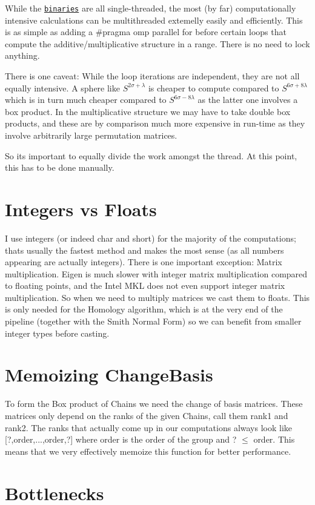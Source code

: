 \begin{DoxyItemize}
\item While the \href{https://github.com/NickG-Math/Mackey/tree/master/bin}{\tt binaries} are all single-\/threaded, the most (by far) computationally intensive calculations can be multithreaded extemelly easily and efficiently. This is as simple as adding a {\ttfamily \#pragma omp parallel for} before certain loops that compute the additive/multiplicative structure in a range. There is no need to lock anything.
\item There is one caveat\+: While the loop iterations are independent, they are not all equally intensive. A sphere like $S^{2\sigma+\lambda}$ is cheaper to compute compared to $S^{6\sigma+8\lambda}$ which is in turn much cheaper compared to $S^{6\sigma-8\lambda}$ as the latter one involves a box product. In the multiplicative structure we may have to take double box products, and these are by comparison much more expensive in run-\/time as they involve arbitrarily large permutation matrices.
\item So it\textquotesingle{}s important to equally divide the work amongst the thread. At this point, this has to be done manually.
\end{DoxyItemize}\hypertarget{perf_intvsfloat}{}\section{Integers vs Floats}\label{perf_intvsfloat}
I use integers (or indeed {\ttfamily char} and {\ttfamily short}) for the majority of the computations; that\textquotesingle{}s usually the fastest method and makes the most sense (as all numbers appearing are actually integers). There is one important exception\+: Matrix multiplication. Eigen is much slower with integer matrix multiplication compared to floating points, and the Intel M\+KL does not even support integer matrix multiplication. So when we need to multiply matrices we cast them to floats. This is only needed for the Homology algorithm, which is at the very end of the pipeline (together with the Smith Normal Form) so we can benefit from smaller integer types before casting.\hypertarget{perf_memo}{}\section{Memoizing Change\+Basis}\label{perf_memo}
To form the Box product of Chains we need the change of basis matrices. These matrices only depend on the ranks of the given Chains, call them rank1 and rank2. The ranks that actually come up in our computations always look like \mbox{[}?,order,...,order,?\mbox{]} where order is the order of the group and ? $\le$ order. This means that we very effectively memoize this function for better performance.\hypertarget{perf_bottle}{}\section{Bottlenecks}\label{perf_bottle}

